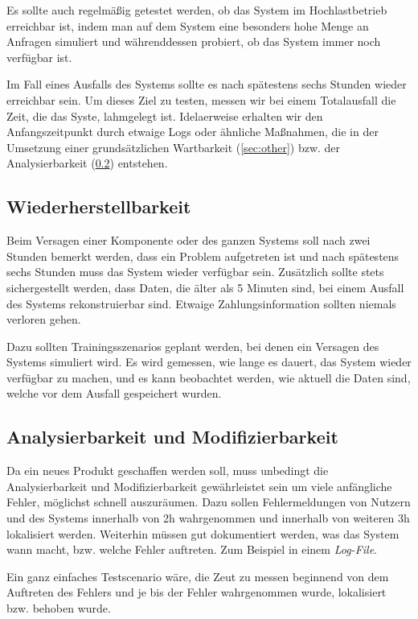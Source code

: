 Es sollte auch regelmäßig getestet werden, ob das System im Hochlastbetrieb erreichbar ist,
indem man auf dem System eine besonders hohe Menge an Anfragen simuliert und währenddessen probiert,
ob das System immer noch verfügbar ist.

Im Fall eines Ausfalls des Systems sollte es nach spätestens sechs Stunden wieder erreichbar sein. Um dieses Ziel zu testen, messen wir bei einem Totalausfall die Zeit, die das Syste, lahmgelegt ist. Idelaerweise erhalten wir den Anfangszeitpunkt durch etwaige Logs oder ähnliche Maßnahmen, die in der Umsetzung einer grundsätzlichen Wartbarkeit (\ref{sec:other}) bzw. der Analysierbarkeit (\ref{sec:anal}) entstehen.

\subsection{Wiederherstellbarkeit}
Beim Versagen einer Komponente oder des ganzen Systems soll nach zwei Stunden bemerkt werden,
dass ein Problem aufgetreten ist und nach spätestens sechs Stunden muss das System wieder verfügbar sein.
Zusätzlich sollte stets sichergestellt werden, dass Daten, die älter als 5 Minuten sind, bei einem Ausfall des Systems rekonstruierbar sind. Etwaige Zahlungsinformation sollten niemals verloren gehen.

Dazu sollten Trainingsszenarios geplant werden, bei denen ein Versagen des Systems simuliert wird.
Es wird gemessen, wie lange es dauert, das System wieder verfügbar zu machen, und es kann beobachtet werden,
wie aktuell die Daten sind, welche vor dem Ausfall gespeichert wurden.


\subsection{Analysierbarkeit und Modifizierbarkeit} \label{sec:anal}
Da ein neues Produkt geschaffen werden soll, muss unbedingt die Analysierbarkeit und Modifizierbarkeit gewährleistet sein um viele anfängliche Fehler, möglichst schnell auszuräumen.
Dazu sollen Fehlermeldungen von Nutzern und des Systems innerhalb von 2h wahrgenommen und innerhalb von weiteren 3h lokalisiert werden.
Weiterhin müssen gut dokumentiert werden, was das System wann macht, bzw. welche Fehler auftreten. Zum Beispiel in einem \textit{Log-File}.

Ein ganz einfaches Testscenario wäre, die Zeut zu messen beginnend von dem Auftreten des Fehlers und je bis der Fehler wahrgenommen wurde, lokalisiert bzw. behoben wurde.

